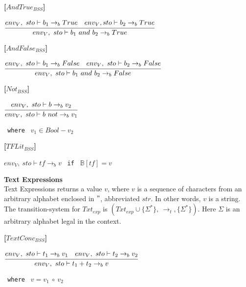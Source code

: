\textbf{[$AndTrue_{BSS}$]}\\
\begin{center}
	\begin{math}
	\cfrac
		{env_V,\ sto \vdash b_1 \rightarrow_b True \quad env_V, sto \vdash b_2 \rightarrow_b True}
		{env_V,\ sto \vdash b_1\ and\ b_2 \rightarrow_b True}
	\end{math}
\end{center}

\textbf{[$AndFalse_{BSS}$]}\\
\begin{center}
	\begin{math}
	\cfrac
		{env_V,\ sto \vdash b_1 \rightarrow_b False \quad env_V,\ sto \vdash b_2 \rightarrow_b False}
		{env_V,\ sto \vdash b_1\ and\ b_2 \rightarrow_b False}
	\end{math}
\end{center}

\textbf{[$Not_{BSS}$]}\\
\begin{center}
	\begin{math}
	\cfrac
	{env_V,\ sto \vdash b \rightarrow_b v_2}
	{env_V,\ sto \vdash b\ not \rightarrow_b v_1}
	\end{math}
	
	\texttt{ where } $v_1 \in Bool - v_2$
\end{center}

\textbf{[$TFLit_{BSS}$]}\\
\begin{center}
	\begin{math}
	env_V,\ sto \vdash tf \rightarrow_b v
	\end{math}
	\texttt{ if } $\mathbb{B}[tf] = v$
\end{center}

\textbf{\large{Text Expressions}}\\
Text Expressions returns a value $v$, where $v$ is a sequence of characters from an arbitrary alphabet enclosed in $"$, abbreviated $str$.
In other words, $v$ is a string.
The transition-system for $Txt_{exp}$ is $(Txt_{exp} \cup \{\Sigma^*\},\ \rightarrow_t, \{\Sigma^*\})$.
Here $\Sigma$ is an arbitrary alphabet legal in the context.

\textbf{[$TextConc_{BSS}$]}\\
\begin{center}
	\begin{math}
	\cfrac
		{env_V,\ sto \vdash t_1 \rightarrow_b v_1 \quad env_V,\ sto \vdash t_2 \rightarrow_b v_2}
		{env_V,\ sto \vdash t_1 + t_2 \rightarrow_b v}
	\end{math}
	
	\texttt{ where } $v = v_1\ \circ\ v_2$
\end{center}

